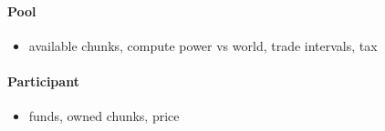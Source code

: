 
\paragraph{Pool}

\begin{itemize}
  \item available chunks, compute power vs world, trade intervals, tax
\end{itemize}

\paragraph{Participant}

\begin{itemize}
  \item funds, owned chunks, price
\end{itemize}